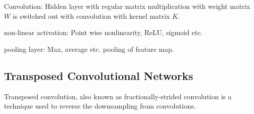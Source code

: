 \documentclass[../../thesis.tex]{subfiles}
\begin{document}
Convolution: Hidden layer with regular matrix multiplication with weight matrix $W$ is switched out with convolution with kernel matrix $K$.

non-linear activation: Point wise nonlinearity, ReLU, sigmoid etc.

pooling layer: Max, average etc. pooling of feature map.





\subsection{Transposed Convolutional Networks}
Transposed convolution, also known as fractionally-strided convolution is a technique used to reverse the downsampling from convolutions. 













\end{document}
